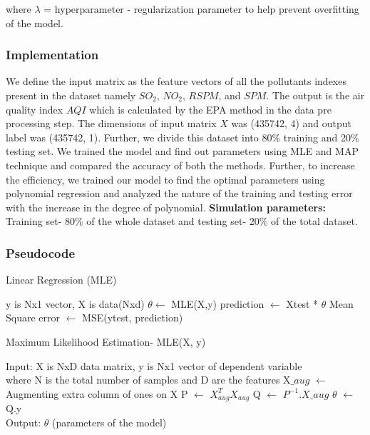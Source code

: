 \documentclass{article}
\begin{document}
\begin{itemize}
    where $\lambda$ = hyperparameter - regularization parameter to help prevent overfitting of the model.

\subsubsection {\color{brown}
\textbf{Implementation}} 
We define the input matrix as the feature vectors of all the pollutants indexes present in the dataset namely $SO_2$, $NO_2$, $RSPM$, and $SPM$. The output is the air quality index $AQI$ which is calculated by the EPA method in the data pre processing step. The dimensions of input matrix $X$ was (435742, 4) and output label was (435742, 1). Further, we divide this dataset into 80\% training and 20\% testing set. We trained the model and find out parameters using MLE and MAP technique and compared the accuracy of both the methods. Further, to increase the efficiency, we trained our model to find the optimal parameters using polynomial regression and analyzed the nature of the training and testing error with the increase in the degree of polynomial.
\textbf{Simulation parameters:} Training set- 80\% of the whole dataset and testing set- 20\% of the total dataset. \\

\newpage
\subsubsection {\color{brown}
\textbf{Pseudocode}}
\begin{algorithm}
            \caption{Linear Regression (MLE)}
            \begin{algorithmic}
            
                \STATE y is Nx1 vector, X is data(Nxd)
                \STATE $\theta \longleftarrow$ MLE(X,y) 
                \STATE prediction $\longleftarrow$ Xtest * $\theta$
                \STATE Mean Square error $\longleftarrow$ MSE(ytest, prediction)
                
            \end{algorithmic}
        \end{algorithm}
    \begin{algorithm}
            \caption{Maximum Likelihood Estimation- MLE(X, y)}
            \begin{algorithmic}
                \STATE Input: X is NxD data matrix, y is Nx1 vector of dependent variable \\ where N is the total number of samples and D are the features
                \STATE X$\_aug$ $\longleftarrow$ Augmenting extra column of ones on X 
                \STATE P $\longleftarrow$ $X_{aug}^TX_{aug}$
                \STATE Q $\longleftarrow$ $P^{-1}.X\_aug$
                \STATE $\theta$ $\longleftarrow$ Q.y \\
                \STATE Output: $\theta$ (parameters of the model)
            \end{algorithmic}
        \end{algorithm}
        

\end{itemize}
\end{document}
